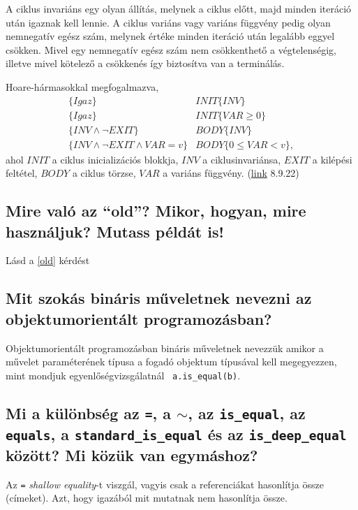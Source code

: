	A ciklus invariáns egy olyan állítás, melynek a ciklus előtt, majd minden iteráció után igaznak kell lennie. A ciklus variáns vagy variáns függvény pedig olyan nemnegatív egész szám, melynek értéke minden iteráció után legalább eggyel csökken. Mivel egy nemnegatív egész szám nem csökkenthető a végtelenségig, illetve mivel kötelező a csökkenés így biztosítva van a terminálás.
	
	Hoare-hármasokkal megfogalmazva,
	\begin{align*}
	\{Igaz\}&INIT\{INV\}\\
	\{Igaz\}&INIT\{VAR\geq 0\}\\
	\{INV\wedge\neg EXIT\}&BODY\{INV\}\\
	\{INV\wedge\neg EXIT\wedge VAR=v\}&BODY\{0\leq VAR<v\},
	\end{align*}
	ahol $INIT$ a ciklus inicializációs blokkja, $INV$ a ciklusinvariánsa, $EXIT$ a kilépési feltétel, $BODY$ a ciklus törzse, $VAR$ a variáns függvény. (\href{http://www.ecma-international.org/publications/files/ECMA-ST/ECMA-367.pdf}{link} 8.9.22)
	
\subsection{ Mire való az “old”? Mikor, hogyan, mire használjuk? Mutass példát is! }
	Lásd a \ref{old} kérdést
	
\subsection{ Mit szokás bináris műveletnek nevezni az objektumorientált programozásban? }
	Objektumorientált programozásban bináris műveletnek nevezzük amikor a művelet paraméterének típusa a fogadó objektum típusával kell megegyezzen, mint mondjuk egyenlőségvizsgálatnál \lstinline[language=Eiffel]| a.is_equal(b)|.
	
\subsection{ Mi a különbség az \lstinline[language=Eiffel]|=|, a $\sim$, az \lstinline[language=Eiffel]|is_equal|, az \lstinline[language=Eiffel]|equals|, a \lstinline[language=Eiffel]|standard_is_equal| és az \lstinline[language=Eiffel]|is_deep_equal| között? Mi közük van egymáshoz? }
	Az \lstinline[language=Eiffel]|=| \textit{shallow equality}-t viszgál, vagyis csak a referenciákat hasonlítja össze (címeket). Azt, hogy igazából mit mutatnak nem hasonlítja össze.
	
